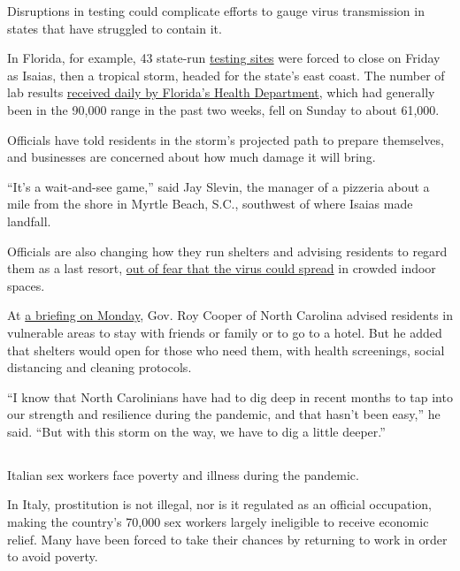 Disruptions in testing could complicate efforts to gauge virus
transmission in states that have struggled to contain it.

In Florida, for example, 43 state-run
\href{https://floridadisaster.org/covid19/testing-sites/}{testing sites}
were forced to close on Friday as Isaias, then a tropical storm, headed
for the state's east coast. The number of lab results
\href{http://ww11.doh.state.fl.us/comm/_partners/covid19_report_archive/state_reports_latest.pdf}{received
daily by Florida's Health Department}, which had generally been in the
90,000 range in the past two weeks, fell on Sunday to about 61,000.

Officials have told residents in the storm's projected path to prepare
themselves, and businesses are concerned about how much damage it will
bring.

``It's a wait-and-see game,'' said Jay Slevin, the manager of a pizzeria
about a mile from the shore in Myrtle Beach, S.C., southwest of where
Isaias made landfall.

Officials are also changing how they run shelters and advising residents
to regard them as a last resort,
\href{https://www.nytimes3xbfgragh.onion/2020/07/26/us/virus-texas-storm.html}{out
of fear that the virus could spread} in crowded indoor spaces.

At
\href{https://www.ncdps.gov/storm-update?fbclid=IwAR3gtINKPXqQdsJixuf1kwBKbAtEMz62wzyoDHlu7FDBN1HTarDlw8FlVwQ}{a
briefing on Monday}, Gov. Roy Cooper of North Carolina advised residents
in vulnerable areas to stay with friends or family or to go to a hotel.
But he added that shelters would open for those who need them, with
health screenings, social distancing and cleaning protocols.

``I know that North Carolinians have had to dig deep in recent months to
tap into our strength and resilience during the pandemic, and that
hasn't been easy,'' he said. ``But with this storm on the way, we have
to dig a little deeper.''

\hypertarget{-3}{%
\subsection{}\label{-3}}

Italian sex workers face poverty and illness during the pandemic.

In Italy, prostitution is not illegal, nor is it regulated as an
official occupation, making the country's 70,000 sex workers largely
ineligible to receive economic relief. Many have been forced to take
their chances by returning to work in order to avoid poverty.

